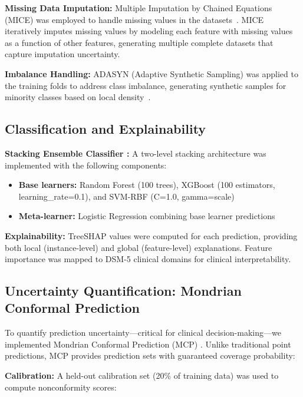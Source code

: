 \textbf{Missing Data Imputation:} Multiple Imputation by Chained Equations (MICE) was employed to handle missing values in the datasets~\textbf{\cite{ref50}}. MICE iteratively imputes missing values by modeling each feature with missing values as a function of other features, generating multiple complete datasets that capture imputation uncertainty.

\textbf{Imbalance Handling:} ADASYN (Adaptive Synthetic Sampling) was applied to the training folds to address class imbalance, generating synthetic samples for minority classes based on local density~\textbf{\cite{ref51,ref52}}.

\subsection{Classification and Explainability}\label{classification-and-explainability}

\textbf{Stacking Ensemble Classifier \cite{ref53}:} A two-level stacking architecture was implemented with the following components:

\begin{itemize}
\tightlist
\item
  \textbf{Base learners:} Random Forest \cite{ref54} (100 trees), XGBoost \cite{ref55} (100 estimators, learning\_rate=0.1), and SVM-RBF (C=1.0, gamma=scale)
\item
  \textbf{Meta-learner:} Logistic Regression combining base learner predictions
\end{itemize}

\textbf{Explainability:} TreeSHAP values were computed for each prediction, providing both local (instance-level) and global (feature-level) explanations. Feature importance was mapped to DSM-5 clinical domains for clinical interpretability.

\subsection{Uncertainty Quantification: Mondrian Conformal Prediction}\label{uncertainty-quantification-mondrian-conformal-prediction}

To quantify prediction uncertainty---critical for clinical decision-making---we implemented Mondrian Conformal Prediction (MCP) \cite{ref56}. Unlike traditional point predictions, MCP provides prediction sets with guaranteed coverage probability:

\textbf{Calibration:} A held-out calibration set (20\% of training data) was used to compute nonconformity scores:

